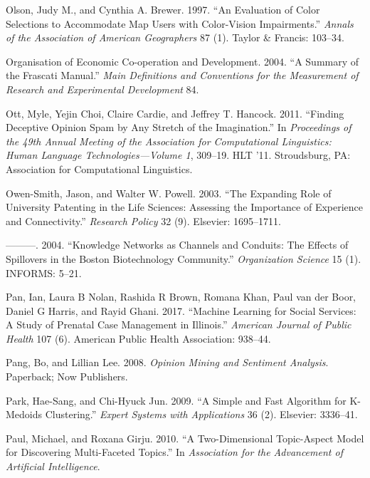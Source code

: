 \documentclass[]{krantz}
\begin{document}
\hypertarget{ref-olson1997evaluation}{}
Olson, Judy M., and Cynthia A. Brewer. 1997. ``An Evaluation of Color
Selections to Accommodate Map Users with Color-Vision Impairments.''
\emph{Annals of the Association of American Geographers} 87 (1). Taylor
\& Francis: 103--34.

\hypertarget{ref-manual2004summary}{}
Organisation of Economic Co-operation and Development. 2004. ``A Summary
of the Frascati Manual.'' \emph{Main Definitions and Conventions for the
Measurement of Research and Experimental Development} 84.

\hypertarget{ref-ott-11}{}
Ott, Myle, Yejin Choi, Claire Cardie, and Jeffrey T. Hancock. 2011.
``Finding Deceptive Opinion Spam by Any Stretch of the Imagination.'' In
\emph{Proceedings of the 49th Annual Meeting of the Association for
Computational Linguistics: Human Language Technologies---Volume 1},
309--19. HLT '11. Stroudsburg, PA: Association for Computational
Linguistics.

\hypertarget{ref-owen2003expanding}{}
Owen-Smith, Jason, and Walter W. Powell. 2003. ``The Expanding Role of
University Patenting in the Life Sciences: Assessing the Importance of
Experience and Connectivity.'' \emph{Research Policy} 32 (9). Elsevier:
1695--1711.

\hypertarget{ref-owen2004knowledge}{}
---------. 2004. ``Knowledge Networks as Channels and Conduits: The
Effects of Spillovers in the Boston Biotechnology Community.''
\emph{Organization Science} 15 (1). INFORMS: 5--21.

\hypertarget{ref-pan2017}{}
Pan, Ian, Laura B Nolan, Rashida R Brown, Romana Khan, Paul van der
Boor, Daniel G Harris, and Rayid Ghani. 2017. ``Machine Learning for
Social Services: A Study of Prenatal Case Management in Illinois.''
\emph{American Journal of Public Health} 107 (6). American Public Health
Association: 938--44.

\hypertarget{ref-pang-08}{}
Pang, Bo, and Lillian Lee. 2008. \emph{Opinion Mining and Sentiment
Analysis}. Paperback; Now Publishers.

\hypertarget{ref-park2009simple}{}
Park, Hae-Sang, and Chi-Hyuck Jun. 2009. ``A Simple and Fast Algorithm
for K-Medoids Clustering.'' \emph{Expert Systems with Applications} 36
(2). Elsevier: 3336--41.

\hypertarget{ref-paul-10}{}
Paul, Michael, and Roxana Girju. 2010. ``A Two-Dimensional Topic-Aspect
Model for Discovering Multi-Faceted Topics.'' In \emph{Association for
the Advancement of Artificial Intelligence}.
\end{document}
